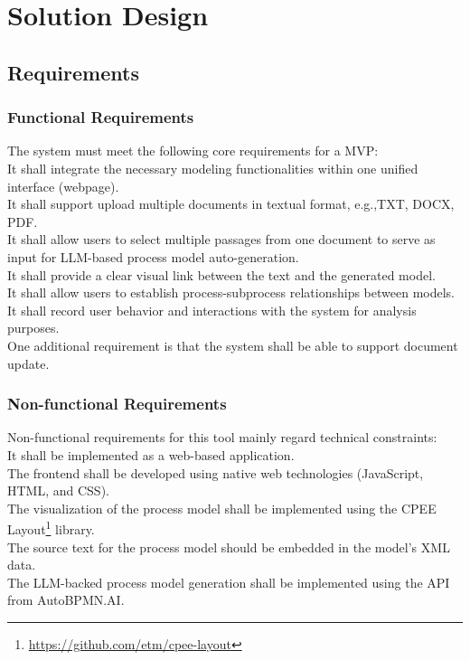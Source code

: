 \chapter{Solution Design}
\label{sec:solution}

\section{Requirements}
\label{sec:solution:req}
\subsection{Functional Requirements}
The system must meet the following core requirements for a MVP:\\
It shall integrate the necessary modeling functionalities within one unified interface (webpage).\\
It shall support upload multiple documents in textual format, e.g.,TXT, DOCX, PDF.\\
It shall allow users to select multiple passages from one document to serve as input for LLM-based process model auto-generation. \\
It shall provide a clear visual link between the text and the generated model.\\
It shall allow users to establish process-subprocess relationships between models.\\
It shall record user behavior and interactions with the system for analysis purposes.\\
One additional requirement is that the system shall be able to support document update.
\subsection{Non-functional Requirements}
Non-functional requirements for this tool mainly regard technical constraints:\\
It shall be implemented as a web-based application.\\
The frontend shall be developed using native web technologies (JavaScript, HTML, and CSS).\\
The visualization of the process model shall be implemented using the CPEE Layout\footnote{\url{https://github.com/etm/cpee-layout}} library.\\
The source text for the process model should be embedded in the model's XML data.\\
The LLM-backed process model generation shall be implemented using the API from AutoBPMN.AI.\\

